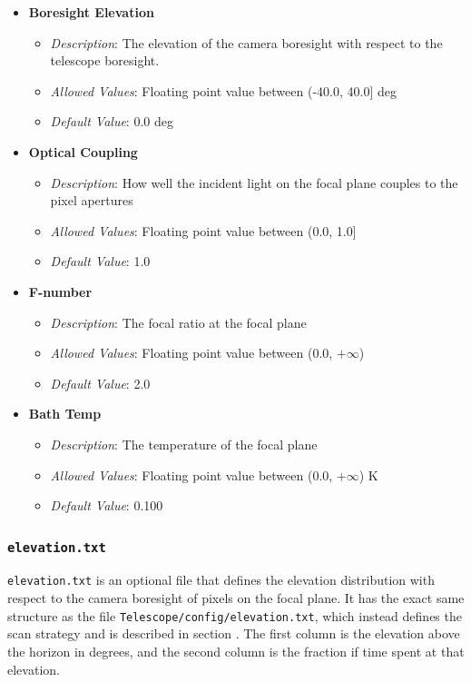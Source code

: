 \documentclass[11pt]{article} %
\begin{document}
\begin{itemize}[noitemsep,topsep=0pt]
	\item \textbf{Boresight Elevation}
		\begin{itemize}[noitemsep,topsep=0pt]
		\item \textit{Description}: The elevation of the camera boresight with respect to the telescope boresight. 
		\item \textit{Allowed Values}: Floating point value between (-40.0, 40.0] deg
		\item \textit{Default Value}: 0.0 deg
		\end{itemize}
	\item \textbf{Optical Coupling}
		\begin{itemize}[noitemsep,topsep=0pt]
		\item \textit{Description}: How well the incident light on the focal plane couples to the pixel apertures 
		\item \textit{Allowed Values}: Floating point value between (0.0, 1.0]
		\item \textit{Default Value}: 1.0
		\end{itemize}
	\item \textbf{F-number}
		\begin{itemize}[noitemsep,topsep=0pt]
		\item \textit{Description}: The focal ratio at the focal plane
		\item \textit{Allowed Values}: Floating point value between (0.0, $+\infty$)
		\item \textit{Default Value}: 2.0
		\end{itemize}
	\item \textbf{Bath Temp}
		\begin{itemize}[noitemsep,topsep=0pt]
		\item \textit{Description}: The temperature of the focal plane 
		\item \textit{Allowed Values}: Floating point value between (0.0, $+\infty$) K
		\item \textit{Default Value}: 0.100
		\end{itemize}
\end{itemize}


\subsubsection{\texttt{elevation.txt}}

\texttt{elevation.txt} is an optional file that defines the elevation distribution with respect to the camera boresight of pixels on the focal plane. It has the exact same structure as the file \texttt{Telescope/config/elevation.txt}, which instead defines the scan strategy and is described in section \cite{sec:telelv}. The first column is the elevation above the horizon in degrees, and the second column is the fraction if time spent at that elevation. 
\end{document}
